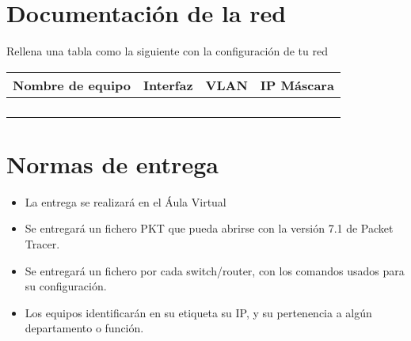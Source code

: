 \section{Documentación de la red}
Rellena una tabla como la siguiente con la configuración de tu red

\begin{center}
  \begin{tabular}{|c|c|c|c|}
    \hline
    Nombre de equipo & Interfaz & VLAN & IP Máscara \\
    \hline
                     & & & \\
                     & & & \\
                     & & & \\
                     & & & \\
    \hline
  \end{tabular}
\end{center}

\section{Normas de entrega}
\begin{itemize}
  
\item La entrega se realizará en el Áula Virtual
\item Se entregará un fichero PKT que pueda abrirse con la versión 7.1 de Packet Tracer.
\item Se entregará un fichero por cada switch/router, con los comandos usados para su configuración.
\item Los equipos identificarán en su etiqueta su IP, y su pertenencia a algún departamento o función.
\end{itemize}


